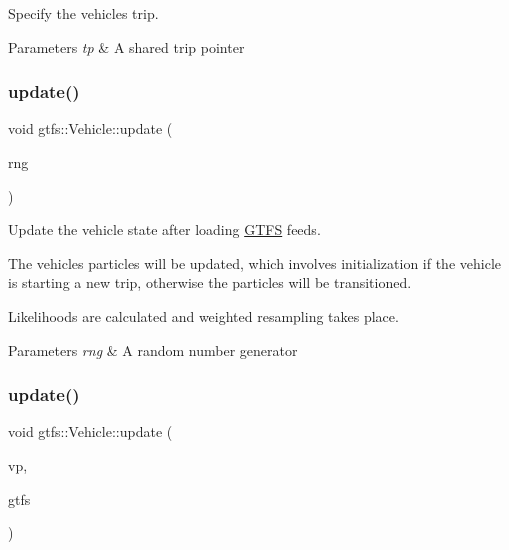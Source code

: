 Specify the vehicles trip. 
\begin{DoxyParams}{Parameters}
{\em tp} & A shared trip pointer \\
\hline
\end{DoxyParams}
\mbox{\label{classgtfs_1_1Vehicle_a4baee648ab1db5b69aa2ffef7203c2bf}} 
\subsubsection{\texorpdfstring{update()}{update()}\hspace{0.1cm}{\footnotesize\ttfamily [1/3]}}
{\footnotesize\ttfamily void gtfs\+::\+Vehicle\+::update (\begin{DoxyParamCaption}\item[{\hyperlink{classsampling_1_1RNG}{sampling\+::\+R\+NG} \&}]{rng }\end{DoxyParamCaption})}

Update the vehicle state after loading \hyperlink{classgtfs_1_1GTFS}{G\+T\+FS} feeds.

The vehicle\textquotesingle{}s particles will be updated, which involves initialization if the vehicle is starting a new trip, otherwise the particles will be transitioned.

Likelihoods are calculated and weighted resampling takes place.


\begin{DoxyParams}{Parameters}
{\em rng} & A random number generator \\
\hline
\end{DoxyParams}
\mbox{\label{classgtfs_1_1Vehicle_add9266d843398c88d3fcc22239f586a9}} 
\subsubsection{\texorpdfstring{update()}{update()}\hspace{0.1cm}{\footnotesize\ttfamily [2/3]}}
{\footnotesize\ttfamily void gtfs\+::\+Vehicle\+::update (\begin{DoxyParamCaption}\item[{const transit\+\_\+realtime\+::\+Vehicle\+Position \&}]{vp,  }\item[{\hyperlink{classgtfs_1_1GTFS}{G\+T\+FS} \&}]{gtfs }\end{DoxyParamCaption})}


